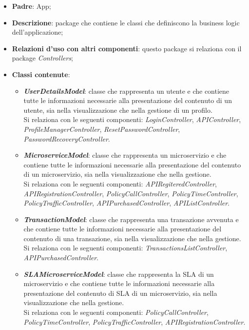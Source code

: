 \begin{itemize}
	\item \textbf{Padre}: App;
	
	\item \textbf{Descrizione}: package che contiene le classi che definiscono la business logic dell'applicazione;
	
	\item \textbf{Relazioni d’uso con altri componenti}: questo package si relaziona con il package \textit{Controllers};
	
	\item \textbf{Classi contenute}:
	\begin{itemize}
		\item \textbf{\textit{UserDetailsModel}}: classe che rappresenta un utente e che contiene tutte le informazioni necessarie alla presentazione del contenuto di un utente, sia nella visualizzazione che nella gestione di un profilo.\\
		Si relaziona con le seguenti componenti: \textit{LoginController}, \textit{APIController}, \textit{ProfileManagerController}, \textit{ResetPasswordController}, \textit{PasswordRecoveryController}.
		
		\item \textbf{\textit{MicroserviceModel}}: classe che rappresenta un microservizio e che contiene tutte le informazioni necessarie alla presentazione del contenuto di un microservizio, sia nella visualizzazione che nella gestione.\\
		Si relaziona con le seguenti componenti: \textit{APIRegiteredController}, \textit{APIRegistrationController}, \textit{PolicyCallController}, \textit{PolicyTimeController}, \textit{PolicyTrafficController}, \textit{APIPurchasedController}, \textit{APIListController}.
		
		\item \textbf{\textit{TransactionModel}}:  classe che rappresenta una transazione avvenuta e che contiene tutte le informazioni necessarie alla presentazione del contenuto di una transazione, sia nella visualizzazione che nella gestione.\\
		Si relaziona con le seguenti componenti: \textit{TransactionsListController}, \textit{APIPurchasedController}.
		
		\item \textbf{\textit{SLAMicroserviceModel}}:  classe che rappresenta la SLA di un microservizio e che contiene tutte le informazioni necessarie alla presentazione del contenuto di SLA di un microservizio, sia nella visualizzazione che nella gestione.\\
		Si relaziona con le seguenti componenti: \textit{PolicyCallController}, \textit{PolicyTimeController}, \textit{PolicyTrafficController}, \textit{APIRegistrationController}.
	\end{itemize}
\end{itemize}
	
